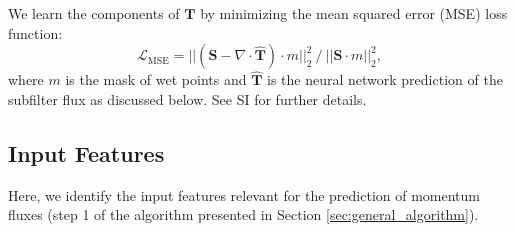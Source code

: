 \documentclass[draft]{agujournal2019}
\begin{document}
We learn the components of $\mathbf{T}$ by minimizing the  mean squared error (MSE) loss function:
\begin{equation}
\mathcal{L}_{\mathrm{MSE}} = ||(\mathbf{S} - \nabla \cdot \widehat{\mathbf{T}}) \cdot m ||_2^2 ~ / ~||\mathbf{S} \cdot m||_2^2, \label{eq:mse_loss}
\end{equation}
where $m$ is the mask of wet points and $\widehat{\mathbf{T}}$ is the neural network prediction of the subfilter flux as discussed below. See SI for further details.  

\subsection{Input Features}
Here, we identify the input features relevant for the prediction of momentum fluxes (step 1 of the algorithm presented in Section \ref{sec:general_algorithm}).
\end{document}
